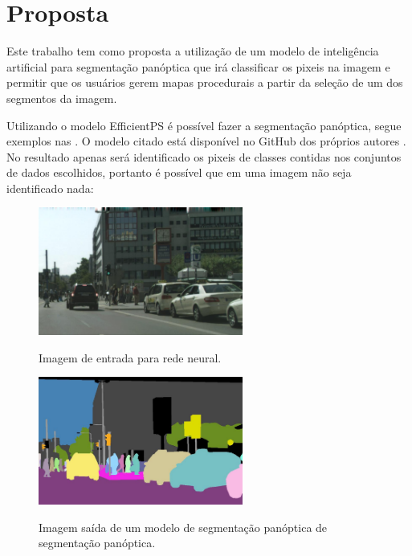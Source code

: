 \section{Proposta}

Este trabalho tem como proposta a utilização de um modelo de inteligência artificial para segmentação panóptica que irá classificar os pixeis na imagem e permitir que os usuários gerem mapas procedurais a partir da seleção de um dos segmentos da imagem.

Utilizando o modelo EfficientPS é possível fazer a segmentação panóptica, segue exemplos nas . O modelo citado está disponível no GitHub dos próprios autores .
No resultado apenas será identificado os pixeis de classes contidas nos conjuntos de dados escolhidos, portanto é possível que em uma imagem não seja identificado nada:

\begin{figure}[!ht]
	\centering
    \caption{Imagem de entrada para rede neural.}
	\includegraphics[width=0.6\textwidth]{figures/segmantations_1.png}
	\label{fig:segmantations_1}
\end{figure}

\begin{figure}[!ht]
	\centering
    \caption{Imagem saída de um modelo de segmentação panóptica de segmentação panóptica.}
	\includegraphics[width=0.6\textwidth]{figures/segmantations_2.png}
	\label{fig:segmantations_2}
\end{figure}

